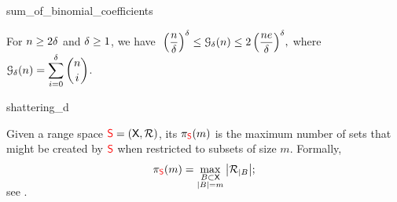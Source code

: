 

\providecommand{\LemmaGrowthImproved}{%
   For $n \geq 2\Dim$ and $\Dim \geq 1$, we have 
   \begin{math}
       \;\displaystyle%
       \pth{\frac{n }{\Dim}}^\Dim%
       \leq%
       \Growth{\Dim}{n}%
       \leq%
       2\, \pth{\frac{n e}{\Dim}}^\Dim,
   \end{math}
   where $\ds\Growth{\Dim}{n} = \sum_{i=0}^{\Dim} \binom{n}{i}$.}

\begin{fragment}{sum_of_binomial_coefficients}
    \providecommand{\LemmaGrowthImproved}{%
       For $n \geq 2\Dim$ and $\Dim \geq 1$, we have
       \begin{math}
           \;\displaystyle \pth{\frac{n }{\Dim}}^\Dim%
           \leq%
           \Growth{\Dim}{n}%
           \leq%
           2\; \pth{\frac{n e}{\Dim}}^\Dim,
       \end{math}
        where $\ds\Growth{\Dim}{n} =
       \sum_{i=0}^{\Dim} \binom{n}{i}$.}
    \begin{lemma}
        \LemmaGrowthImproved        
    \end{lemma}
\end{fragment}


\begin{fragment}{shattering_d}
    \begin{defn}
        Given a range space ${\textcolor{red}{\mathsf{S}}} = (\textsf{X}, {\mathcal{R}})$,
        its  $\pi_{{\textcolor{red}{\mathsf{S}}}}(m)$ is
        the maximum number of sets that might be created by
        ${\textcolor{red}{\mathsf{S}}}$ when restricted to subsets of size
        $m$. Formally,
        \begin{equation*}
            \ShatterFunc{\RangeSpace}(m)%
            =%
            \smash{\max_{\substack{B \subset \GroundSet\\
                     \cardin{B} = m}} \cardin{ \VCProj{\RangeSet}{B} }};
        \end{equation*}
        see .
    \end{defn}
\end{fragment}



